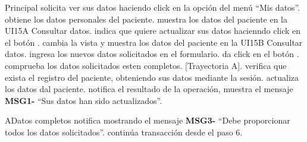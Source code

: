 \begin{UCtrayectoria}{Principal}
  \UCpaso[\UCactor] solicita ver sus datos haciendo click en la opción del menú “Mis datos”.
  \UCpaso obtiene los datos personales del paciente.
  \UCpaso muestra los datos del paciente en la UI15A Consultar datos.
  \UCpaso[\UCactor] indica que quiere actualizar sus datos hacienndo click en el botón .
  \UCpaso cambia la vista y muestra los datos del paciente en la UI15B Consultar datos.
  \UCpaso[\UCactor] ingresa los nuevos datos solicitados en el formulario.
  \UCpaso[\UCactor] da click en el botón .
  \UCpaso comprueba los datos solicitados esten completos. [Trayectoria A].
  \UCpaso verifica que exista el registro del paciente, obteniendo sus datos mediante la sesión.
  \UCpaso actualiza los datos dal paciente.
  \UCpaso notifica el resultado de la operación, muestra el mensaje {\bf MSG1-} “Sus datos han sido actualizados”. 
\end{UCtrayectoria}

\begin{UCtrayectoriaA}{A}{Datos completos}
  \UCpaso notifica mostrando el mensaje {\bf MSG3-} “Debe proporcionar todos los datos solicitados”.
  \UCpaso continúa transacción desde el paso 6.
\end{UCtrayectoriaA}

